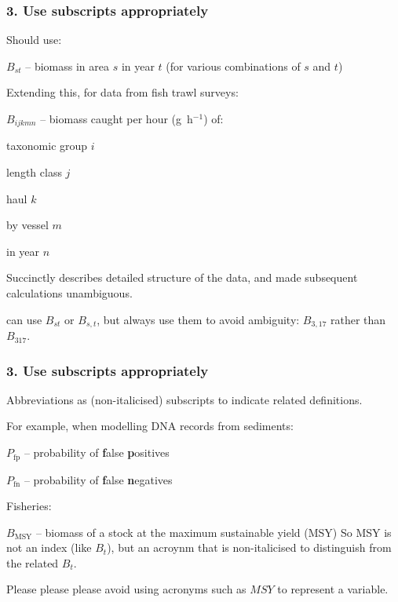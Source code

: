 
\begin{frame}
\frametitle{3. Use subscripts appropriately}

Should use:

\bi
\item $B_{st}$ -- biomass in area $s$ in year $t$ (for various combinations of $s$ and $t$)
\ei

\pause

Extending this, for data from fish trawl surveys:
\bi
  \item $B_{ijkmn}$ -- biomass caught per hour (g~h$^{-1}$) of:
  \bi
    \item taxonomic group $i$
    \item length class $j$
    \item haul $k$
    \item by vessel $m$
    \item in year $n$
  \ei
\ei

Succinctly describes detailed structure of the data, and made subsequent
calculations unambiguous.

\pause
\medskip

 can use $B_{st}$ or $B_{s,t}$, but always use them to avoid
ambiguity: $B_{3,17}$ rather than $B_{317}$.

\end{frame}


\begin{frame}
\frametitle{3. Use subscripts appropriately}

Abbreviations as (non-italicised) subscripts to indicate related
definitions.

\medskip

For example, when modelling DNA records from sediments:
\bi
  \item $P_\mathrm{fp}$ -- probability of {\bf f}alse {\bf p}ositives
  \item $P_\mathrm{fn}$ -- probability of {\bf f}alse {\bf n}egatives
\ei
\pause
\medskip

Fisheries:
\bi
  \item $B_\mathrm{MSY}$ -- biomass of a stock at the maximum sustainable yield (MSY)
\ei
So MSY is not an index (like $B_t$), but an acroynm that is non-italicised to
distinguish from the related $B_t$.
\pause
\medskip

Please please please avoid using acronyms such as $MSY$ to represent a variable.

\end{frame}

